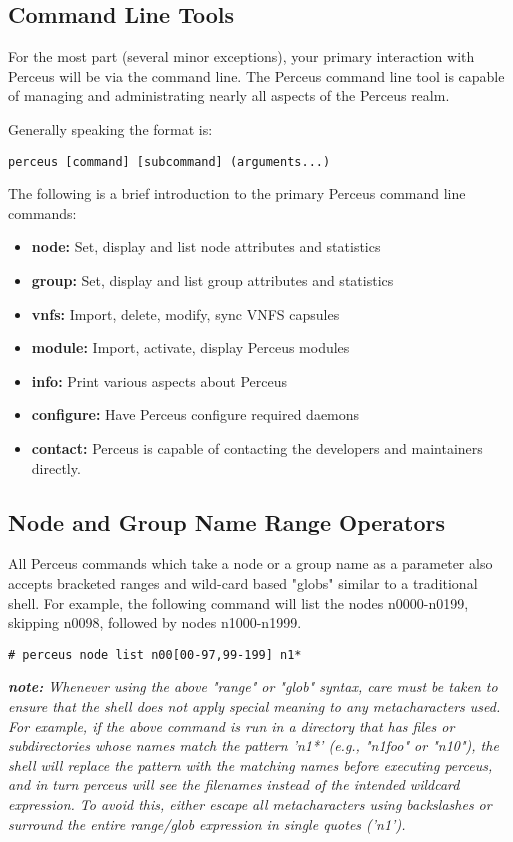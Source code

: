 \documentclass[10pt,letterpaper]{report}
\begin{document}
\subsection{Command Line Tools}

For the most part (several minor exceptions), your primary interaction with
Perceus will be via the command line. The Perceus command line tool is capable
of managing and administrating nearly all aspects of the Perceus realm.

\noindent Generally speaking the format is:

\begin{verbatim}
perceus [command] [subcommand] (arguments...)
\end{verbatim}

\noindent The following is a brief introduction to the primary Perceus command
line commands:

\begin{itemize}
\item {\bf node:} Set, display and list node attributes and statistics
\item {\bf group:} Set, display and list group attributes and statistics
\item {\bf vnfs:} Import, delete, modify, sync VNFS capsules
\item {\bf module:} Import, activate, display Perceus modules
\item {\bf info:} Print various aspects about Perceus
\item {\bf configure:} Have Perceus configure required daemons
\item {\bf contact:} Perceus is capable of contacting the developers and
maintainers directly.
\end{itemize}

\subsection{Node and Group Name Range Operators}

All Perceus commands which take a node or a group name as a parameter also
accepts bracketed ranges and wild-card based "globs" similar to a traditional
shell. For example, the following command will list the nodes n0000-n0199,
skipping n0098, followed by nodes n1000-n1999.

\begin{verbatim}
# perceus node list n00[00-97,99-199] n1*
\end{verbatim}

{\it {\bf note:} Whenever using the above "range" or "glob" syntax, care must
be taken to ensure that the shell does not apply special meaning to any
metacharacters used.  For example, if the above command is run in a directory
that has files or subdirectories whose names match the pattern 'n1*' (e.g.,
"n1foo" or "n10"), the shell will replace the pattern with the matching names
before executing perceus, and in turn perceus will see the filenames instead
of the intended wildcard expression.  To avoid this, either escape all
metacharacters using backslashes or surround the entire range/glob expression
in single quotes ('n1\*').}
\end{document}
